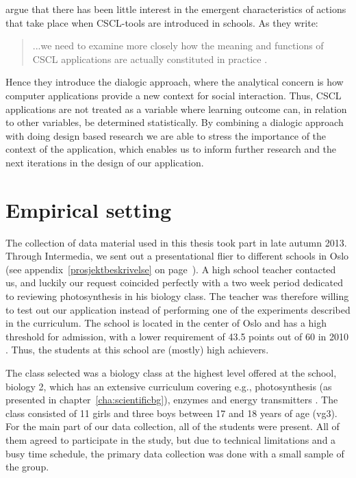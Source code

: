 \citeauthor*{arnseth2006approaching} argue that there has been little interest in the emergent characteristics of actions that take place when CSCL-tools are introduced in schools. As they write: \begin{quote}...we need to examine more closely how the meaning and functions of CSCL applications are actually constituted in practice \citep[p. 181]{arnseth2006approaching}.\end{quote} Hence they introduce the dialogic approach, where the analytical concern is how computer applications provide a new context for social interaction. Thus, CSCL applications are not treated as a variable where learning outcome can, in relation to other variables, be determined statistically. By combining a dialogic approach with doing design based research we are able to stress the importance of the context of the application, which enables us to inform further research and the next iterations in the design of our application.  

\section{Empirical setting}
The collection of data material used in this thesis took part in late autumn 2013. Through Intermedia, we sent out a presentational flier to different schools in Oslo (see appendix~\ref{prosjektbeskrivelse} on page~\pageref{prosjektbeskrivelse}). A high school teacher contacted us, and luckily our request coincided perfectly with a two week period dedicated to reviewing photosynthesis in his biology class. The teacher was therefore willing to test out our application instead of performing one of the experiments described in the curriculum. The school is located in the center of Oslo and has a high threshold for admission, with a lower requirement of 43.5 points out of 60 in 2010 \citep{utdanningsetaten}. Thus, the students at this school are (mostly) high achievers.  

The class selected was a biology class at the highest level offered at the school, biology 2, which has an extensive curriculum covering e.g., photosynthesis (as presented in chapter~\ref{cha:scientificbg}), enzymes and energy transmitters \citep{bios}. The class consisted of 11 girls and three boys between 17 and 18 years of age (vg3). For the main part of our data collection, all of the students were present. All of them agreed to participate in the study, but due to technical limitations and a busy time schedule, the primary data collection was  done with a small sample of the group. 


